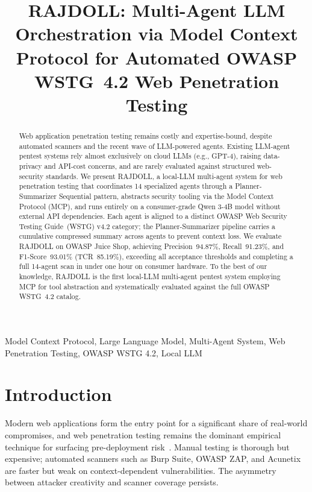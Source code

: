 \documentclass[conference]{IEEEtran}
\title{RAJDOLL: Multi-Agent LLM Orchestration via Model Context
Protocol for Automated OWASP WSTG~4.2 Web Penetration Testing}
\author{
  \IEEEauthorblockN{Martua Raja Doli Pangaribuan}
  \IEEEauthorblockA{
    Department of Cyber Security Engineering\\
    Politeknik Siber dan Sandi Negara\\
    Bogor, Indonesia\\
    martua.raja@pssn.ac.id
  }
}
\begin{document}
\maketitle

\begin{abstract}
Web application penetration testing remains costly and expertise-bound, despite automated scanners and the recent wave of LLM-powered agents. Existing LLM-agent pentest systems rely almost exclusively on cloud LLMs (e.g., GPT-4), raising data-privacy and API-cost concerns, and are rarely evaluated against structured web-security standards. We present RAJDOLL, a local-LLM multi-agent system for web penetration testing that coordinates 14 specialized agents through a Planner-Summarizer Sequential pattern, abstracts security tooling via the Model Context Protocol (MCP), and runs entirely on a consumer-grade Qwen 3-4B model without external API dependencies. Each agent is aligned to a distinct OWASP Web Security Testing Guide~(WSTG) v4.2 category; the Planner-Summarizer pipeline carries a cumulative compressed summary across agents to prevent context loss. We evaluate RAJDOLL on OWASP Juice Shop, achieving Precision~94.87\%, Recall~91.23\%, and F1-Score~93.01\% (TCR~85.19\%), exceeding all acceptance thresholds and completing a full 14-agent scan in under one hour on consumer hardware. To the best of our knowledge, RAJDOLL is the first local-LLM multi-agent pentest system employing MCP for tool abstraction and systematically evaluated against the full OWASP WSTG~4.2 catalog.
\end{abstract}

\begin{IEEEkeywords}
Model Context Protocol, Large Language Model, Multi-Agent System,
Web Penetration Testing, OWASP WSTG 4.2, Local LLM
\end{IEEEkeywords}

\section{Introduction}

Modern web applications form the entry point for a significant share of real-world compromises, and web penetration testing remains the dominant empirical technique for surfacing pre-deployment risk~\cite{bssn2024}\cite{hackerone2024}. Manual testing is thorough but expensive; automated scanners such as Burp Suite, OWASP ZAP, and Acunetix are faster but weak on context-dependent vulnerabilities. The asymmetry between attacker creativity and scanner coverage persists.
\end{document}

